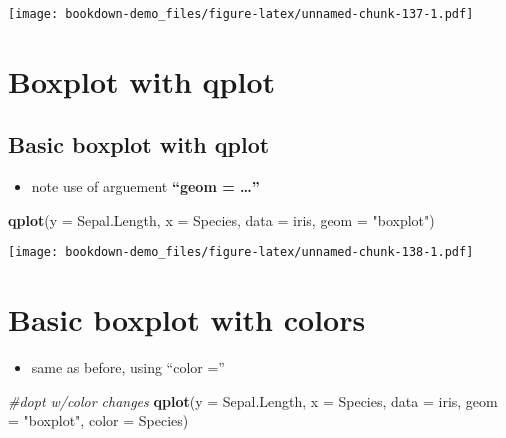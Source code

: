 \documentclass[]{book}
\newenvironment{Shaded}{\begin{snugshade}}{\end{snugshade}}
\newcommand{\KeywordTok}[1]{\textcolor[rgb]{0.13,0.29,0.53}{\textbf{#1}}}
\newcommand{\DataTypeTok}[1]{\textcolor[rgb]{0.13,0.29,0.53}{#1}}
\newcommand{\StringTok}[1]{\textcolor[rgb]{0.31,0.60,0.02}{#1}}
\newcommand{\CommentTok}[1]{\textcolor[rgb]{0.56,0.35,0.01}{\textit{#1}}}
\newcommand{\NormalTok}[1]{#1}
\providecommand{\tightlist}{%
  \setlength{\itemsep}{0pt}\setlength{\parskip}{0pt}}
\theoremstyle{definition}
\theoremstyle{definition}
\theoremstyle{definition}
\theoremstyle{remark}
\begin{document}
\texttt{[image: bookdown-demo\_files/figure-latex/unnamed-chunk-137-1.pdf]}

\section{Boxplot with qplot}\label{boxplot-with-qplot}

\subsection{Basic boxplot with qplot}\label{basic-boxplot-with-qplot}

\begin{itemize}
\tightlist
\item
  note use of arguement \textbf{``geom = \ldots{}''}
\end{itemize}

\begin{Shaded}
\begin{Highlighting}[]
\KeywordTok{qplot}\NormalTok{(}\DataTypeTok{y =}\NormalTok{ Sepal.Length,}
      \DataTypeTok{x =}\NormalTok{ Species,    }
        \DataTypeTok{data =}\NormalTok{ iris,}
      \DataTypeTok{geom =} \StringTok{"boxplot"}\NormalTok{) }
\end{Highlighting}
\end{Shaded}

\texttt{[image: bookdown-demo\_files/figure-latex/unnamed-chunk-138-1.pdf]}

\section{Basic boxplot with colors}\label{basic-boxplot-with-colors}

\begin{itemize}
\tightlist
\item
  same as before, using ``color =''
\end{itemize}

\begin{Shaded}
\begin{Highlighting}[]
\CommentTok{#dopt w/color changes}
\KeywordTok{qplot}\NormalTok{(}\DataTypeTok{y =}\NormalTok{ Sepal.Length,}
      \DataTypeTok{x =}\NormalTok{ Species,    }
        \DataTypeTok{data =}\NormalTok{ iris,}
      \DataTypeTok{geom =} \StringTok{"boxplot"}\NormalTok{,}
      \DataTypeTok{color =}\NormalTok{ Species) }
\end{Highlighting}
\end{Shaded}
\end{document}
